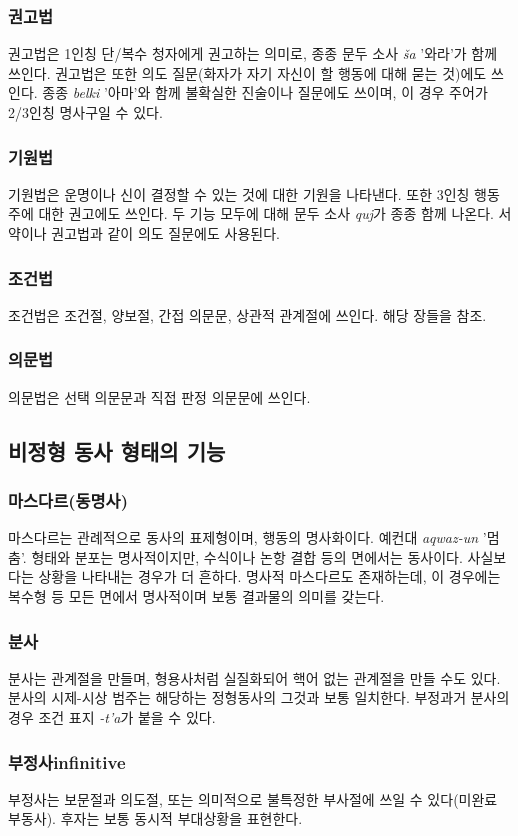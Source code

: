 \subsubsection{권고법}
권고법은 1인칭 단/복수 청자에게 권고하는 의미로, 종종 문두 소사 \textit{ša} '와라'가 함께 쓰인다. 권고법은 또한 의도 질문(화자가 자기 자신이 할 행동에 대해 묻는 것)에도 쓰인다. 종종 \textit{belki} '아마'와 함께 불확실한 진술이나 질문에도 쓰이며, 이 경우 주어가 2/3인칭 명사구일 수 있다. 
\subsubsection{기원법}
기원법은 운명이나 신이 결정할 수 있는 것에 대한 기원을 나타낸다. 또한 3인칭 행동주에 대한 권고에도 쓰인다. 두 기능 모두에 대해 문두 소사 \textit{quj}가 종종 함께 나온다. 서약이나 권고법과 같이 의도 질문에도 사용된다.
\subsubsection{조건법}
조건법은 조건절, 양보절, 간접 의문문, 상관적 관계절에 쓰인다. 해당 장들을 참조.
\subsubsection{의문법}
의문법은 선택 의문문과 직접 판정 의문문에 쓰인다.
\subsection{비정형 동사 형태의 기능}
\subsubsection{마스다르(동명사)}
마스다르는 관례적으로 동사의 표제형이며, 행동의 명사화이다. 예컨대 \textit{aqwaz-un} '멈춤'. 형태와 분포는 명사적이지만, 수식이나 논항 결합 등의 면에서는 동사이다. 사실보다는 상황을 나타내는 경우가 더 흔하다. 명사적 마스다르도 존재하는데, 이 경우에는 복수형 등 모든 면에서 명사적이며 보통 결과물의 의미를 갖는다.
\subsubsection{분사}
분사는 관계절을 만들며, 형용사처럼 실질화되어 핵어 없는 관계절을 만들 수도 있다. 분사의 시제-시상 범주는 해당하는 정형동사의 그것과 보통 일치한다. 부정과거 분사의 경우 조건 표지 \textit{-t'a}가 붙을 수 있다.
\subsubsection{부정사infinitive}
부정사는 보문절과 의도절, 또는 의미적으로 불특정한 부사절에 쓰일 수 있다(미완료 부동사). 후자는 보통 동시적 부대상황을 표현한다.
